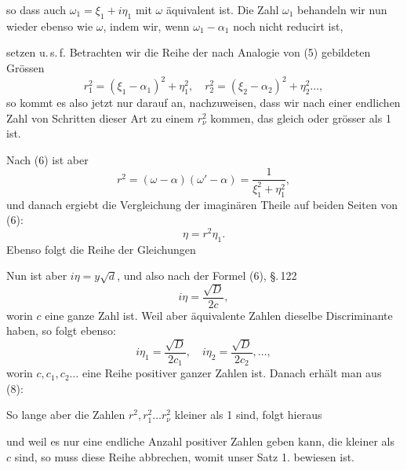 


so dass auch $\omega_1 = \xi_1 + i\eta_1$ mit $\omega$ äquivalent ist. Die Zahl $\omega_1$
behandeln wir nun wieder ebenso wie $\omega$, indem wir, wenn $\omega_1 - \alpha_1$
noch nicht reducirt ist,


setzen u.\,s.\,f. Betrachten wir die Reihe der nach Analogie von (5) gebildeten
Grössen
\[
r_1^2 = (\xi_1-\alpha_1)^2 + \eta_1^2, \quad r_2^2 = (\xi_2-\alpha_2)^2 + \eta_2^2 \ldots,
\]
so kommt es also jetzt nur darauf an, nachzuweisen, dass wir nach einer
endlichen Zahl von Schritten dieser Art zu einem $r_\nu^2$ kommen, das gleich
oder grösser als 1 ist.

Nach (6) ist aber
\[
r^2 = (\omega-\alpha)(\omega'-\alpha) = \dfrac{1}{\xi_1^2+\eta_1^2},
\]
und danach ergiebt die Vergleichung der imaginären Theile auf beiden
Seiten von (6):
\[
\eta = r^2 \eta_1.
\]
Ebenso folgt die Reihe der Gleichungen


Nun ist aber $i\eta = y\sqrt{d}$, und also nach der Formel (6), \S.\,122
\[
i\eta = \dfrac{\sqrt{D}}{2c},
\]
worin $c$ eine ganze Zahl ist. Weil aber äquivalente Zahlen dieselbe
Discriminante haben, so folgt ebenso:
\[
i\eta_1 = \dfrac{\sqrt{D}}{2c_1}, \quad i\eta_2 = \dfrac{\sqrt{D}}{2c_2}, \ldots,
\]
worin $c, c_1, c_2 \ldots$ eine Reihe positiver ganzer Zahlen ist. Danach
erhält man aus (8):


So lange aber die Zahlen $r^2, r_1^2 \ldots r_\nu^2$ kleiner als 1 sind, folgt hieraus


und weil es nur eine endliche Anzahl positiver Zahlen geben kann, die
kleiner als $c$ sind, so muss diese Reihe abbrechen, womit unser Satz 1.
bewiesen ist.
